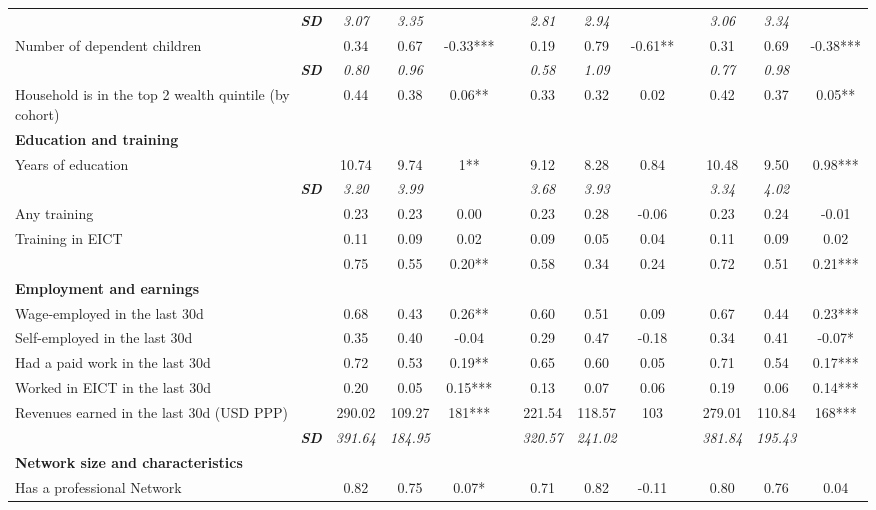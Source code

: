 \begin{landscape}
{\begin{longtable}{m{9cm}ccccccccccc}
\multicolumn{1}{r}{\textit{\textbf{SD}}}&\textit{3.07}&\textit{3.35}&&&\textit{2.81}&\textit{2.94}&&&\textit{3.06}&\textit{3.34}&\\
Number of dependent children&0.34&0.67&    -0.33***&&0.19&0.79&    -0.61**&&0.31&0.69&    -0.38***\\
\multicolumn{1}{r}{\textit{\textbf{SD}}}&\textit{0.80}&\textit{0.96}&&&\textit{0.58}&\textit{1.09}&&&\textit{0.77}&\textit{0.98}&\\
Household is in the top 2 wealth quintile (by cohort)&0.44&0.38&     0.06**&&0.33&0.32&     0.02 &&0.42&0.37&     0.05**\\
\textbf{Education and training}&&&&&&&&&&&\\
Years of education&10.74&9.74&        1**&&9.12&8.28&     0.84 &&10.48&9.50&     0.98***\\
\multicolumn{1}{r}{\textit{\textbf{SD}}}&\textit{3.20}&\textit{3.99}&&&\textit{3.68}&\textit{3.93}&&&\textit{3.34}&\textit{4.02}&\\
Any training&0.23&0.23&     0.00 &&0.23&0.28&    -0.06 &&0.23&0.24&    -0.01 \\
Training in EICT&0.11&0.09&     0.02 &&0.09&0.05&     0.04 &&0.11&0.09&     0.02 \\
&0.75&0.55&     0.20**&&0.58&0.34&     0.24 &&0.72&0.51&     0.21***\\
\textbf{Employment and earnings}&&&&&&&&&&&\\
Wage-employed in the last 30d&0.68&0.43&     0.26**&&0.60&0.51&     0.09 &&0.67&0.44&     0.23***\\
Self-employed in the last 30d&0.35&0.40&    -0.04 &&0.29&0.47&    -0.18 &&0.34&0.41&    -0.07*\\
Had a paid work in the last 30d&0.72&0.53&     0.19**&&0.65&0.60&     0.05 &&0.71&0.54&     0.17***\\
Worked in EICT in the last 30d&0.20&0.05&     0.15***&&0.13&0.07&     0.06 &&0.19&0.06&     0.14***\\
Revenues earned in the last 30d (USD PPP)&290.02&109.27&      181***&&221.54&118.57&      103 &&279.01&110.84&      168***\\
\multicolumn{1}{r}{\textit{\textbf{SD}}}&\textit{391.64}&\textit{184.95}&&&\textit{320.57}&\textit{241.02}&&&\textit{381.84}&\textit{195.43}&\\
\textbf{Network size and characteristics}&&&&&&&&&&&\\
Has a professional Network&0.82&0.75&     0.07*&&0.71&0.82&    -0.11 &&0.80&0.76&     0.04 \\

\end{longtable}}
\end{landscape}
